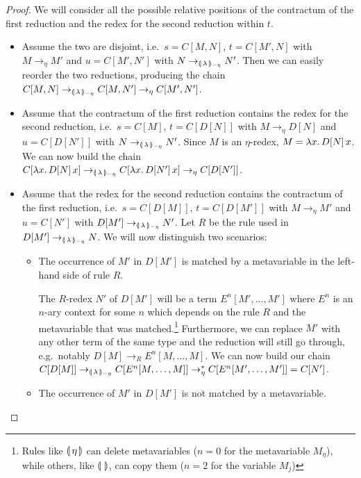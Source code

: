 \begin{proof}
  We will consider all the possible relative positions of the contractum of
  the first reduction and the redex for the second reduction within $t$.
  
  \begin{itemize}
  \item Assume the two are disjoint, i.e.\ $s = C[M,N]$, $t = C[M',N]$ with
    $M \to_\eta M'$ and $u = C[M',N']$ with $N \to_{\llparenthesis \, \lambda \, \rrparenthesis_{-\eta}} N'$. Then we
    can easily reorder the two reductions, producing the chain
    $C[M,N] \to_{\llparenthesis \, \lambda \, \rrparenthesis_{-\eta}} C[M,N'] \to_\eta C[M',N']$.
  \item Assume that the contractum of the first reduction contains the
    redex for the second reduction, i.e.\ $s = C[M]$, $t = C[D[N]]$ with
    $M \to_\eta D[N]$ and $u = C[D[N']]$ with $N \to_{\llparenthesis \, \lambda \, \rrparenthesis_{-\eta}} N'$. Since
    $M$ is an $\eta$-redex, $M = \lambda x.\, D[N]\,x$. We can now build
    the chain
    $C[\lambda x.\, D[N]\,x] \to_{\llparenthesis \, \lambda \, \rrparenthesis_{-\eta}} C[\lambda x.\, D[N']\,x]
    \to_\eta C[D[N']]$.
  \item Assume that the redex for the second reduction contains the
    contractum of the first reduction, i.e.\ $s = C[D[M]]$, $t = C[D[M']]$
    with $M \to_\eta M'$ and $u = C[N']$ with $D[M'] \to_{\llparenthesis \, \lambda \, \rrparenthesis_{-\eta}} N'$. Let
    $R$ be the rule used in $D[M'] \to_{\llparenthesis \, \lambda \, \rrparenthesis_{-\eta}} N$. We will now distinguish
    two scenarios:

    \begin{itemize}
    \item The occurrence of $M'$ in $D[M']$ is matched by a metavariable in
      the left-hand side of rule $R$.
      
      The $R$-redex $N'$ of $D[M']$ will be a term $E^n[M',\ldots,M']$
      where $E^n$ is an $n$-ary context for some $n$ which depends on the
      rule $R$ and the metavariable that was matched.\footnote{Rules like
        $\llparenthesis \, \eta \, \rrparenthesis$ can delete metavariables ($n = 0$ for the
        metavariable $M_\eta$), while others, like $\llparenthesis \, \mathtt{\, \rrparenthesis}$, can copy
        them ($n = 2$ for the variable $M_j$)} Furthermore, we can replace
      $M'$ with any other term of the same type and the reduction will
      still go through, e.g.\ notably $D[M] \to_R E^n[M,\ldots,M]$. We can
      now build our chain
      $C[D[M]] \to_{\llparenthesis \, \lambda \, \rrparenthesis_{-\eta}} C[E^n[M,\ldots,M]] \to^*_\eta
      C[E^n[M',\ldots,M']] = C[N']$.
      
    \item The occurrence of $M'$ in $D[M']$ is not matched by a
      metavariable.
      

\end{itemize}
\end{itemize}
\end{proof}
